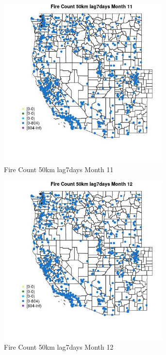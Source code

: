 \begin{figure} 
\centering  
\includegraphics[width=0.77\textwidth]{Code_Outputs/Report_ML_input_PM25_Step4_part_f_de_duplicated_aves_prioritize_24hr_obswNAs_MapObsMo11Fire_Count_50km_lag7days.jpg} 
\caption{\label{fig:Report_ML_input_PM25_Step4_part_f_de_duplicated_aves_prioritize_24hr_obswNAsMapObsMo11Fire_Count_50km_lag7days}Fire Count 50km lag7days Month 11} 
\end{figure} 
 

\begin{figure} 
\centering  
\includegraphics[width=0.77\textwidth]{Code_Outputs/Report_ML_input_PM25_Step4_part_f_de_duplicated_aves_prioritize_24hr_obswNAs_MapObsMo12Fire_Count_50km_lag7days.jpg} 
\caption{\label{fig:Report_ML_input_PM25_Step4_part_f_de_duplicated_aves_prioritize_24hr_obswNAsMapObsMo12Fire_Count_50km_lag7days}Fire Count 50km lag7days Month 12} 
\end{figure} 
 

